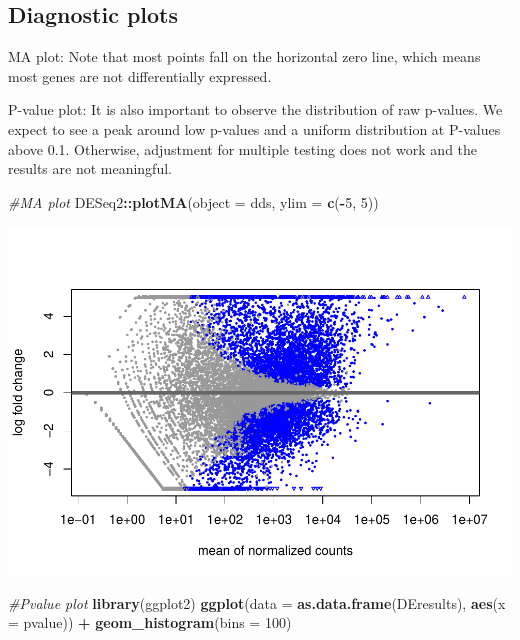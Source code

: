 \documentclass[
]{article}
\newenvironment{Shaded}{\begin{snugshade}}{\end{snugshade}}
\newcommand{\AttributeTok}[1]{\textcolor[rgb]{0.13,0.29,0.53}{#1}}
\newcommand{\CommentTok}[1]{\textcolor[rgb]{0.56,0.35,0.01}{\textit{#1}}}
\newcommand{\DecValTok}[1]{\textcolor[rgb]{0.00,0.00,0.81}{#1}}
\newcommand{\FunctionTok}[1]{\textcolor[rgb]{0.13,0.29,0.53}{\textbf{#1}}}
\newcommand{\NormalTok}[1]{#1}
\newcommand{\SpecialCharTok}[1]{\textcolor[rgb]{0.81,0.36,0.00}{\textbf{#1}}}
\begin{document}
\hypertarget{diagnostic-plots}{%
\subsection{Diagnostic plots}\label{diagnostic-plots}}

MA plot: Note that most points fall on the horizontal zero line, which
means most genes are not differentially expressed.

P-value plot: It is also important to observe the distribution of raw
p-values. We expect to see a peak around low p-values and a uniform
distribution at P-values above 0.1. Otherwise, adjustment for multiple
testing does not work and the results are not meaningful.

\begin{Shaded}
\begin{Highlighting}[]
\CommentTok{\#MA plot}
\NormalTok{DESeq2}\SpecialCharTok{::}\FunctionTok{plotMA}\NormalTok{(}\AttributeTok{object =}\NormalTok{ dds, }\AttributeTok{ylim =} \FunctionTok{c}\NormalTok{(}\SpecialCharTok{{-}}\DecValTok{5}\NormalTok{, }\DecValTok{5}\NormalTok{))}
\end{Highlighting}
\end{Shaded}

\includegraphics{RNA_Analysis_23_files/figure-latex/diag plots-1.pdf}

\begin{Shaded}
\begin{Highlighting}[]
\CommentTok{\#Pvalue plot}
\FunctionTok{library}\NormalTok{(ggplot2)}
\FunctionTok{ggplot}\NormalTok{(}\AttributeTok{data =} \FunctionTok{as.data.frame}\NormalTok{(DEresults), }\FunctionTok{aes}\NormalTok{(}\AttributeTok{x =}\NormalTok{ pvalue)) }\SpecialCharTok{+} 
  \FunctionTok{geom\_histogram}\NormalTok{(}\AttributeTok{bins =} \DecValTok{100}\NormalTok{)}
\end{Highlighting}
\end{Shaded}
\end{document}

